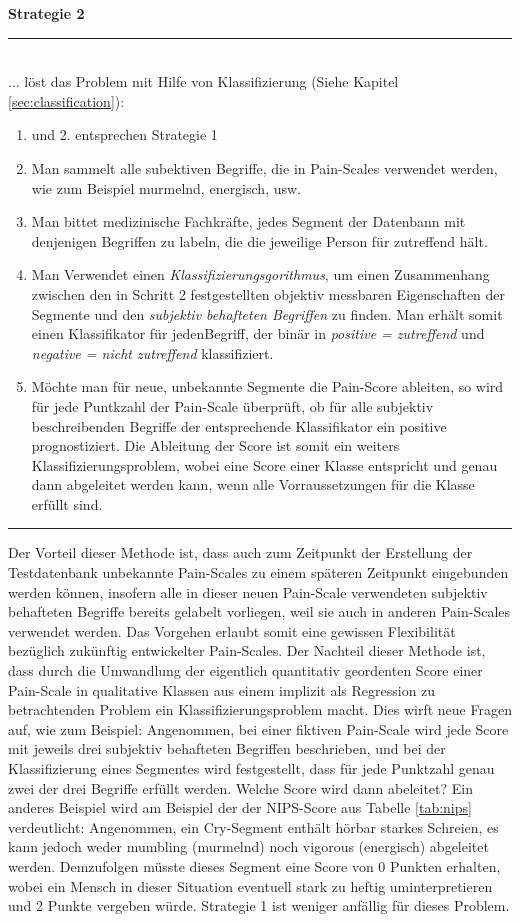 \textbf{Strategie 2} \noindent\rule{0.83\linewidth}{0.3pt} \\
... löst das Problem mit Hilfe von Klassifizierung (Siehe Kapitel \ref{sec:classification}):
\begin{enumerate}
	\item und 2. entsprechen Strategie 1
	\item Man sammelt alle subektiven Begriffe, die in Pain-Scales verwendet werden, wie zum Beispiel \glqq murmelnd\grqq , \glqq energisch\grqq , usw.
	\item Man bittet medizinische Fachkräfte, jedes Segment der Datenbann mit denjenigen Begriffen zu labeln, die die jeweilige Person für zutreffend hält. 
	\item  Man Verwendet einen \emph{Klassifizierungsgorithmus}, um einen Zusammenhang zwischen den in Schritt 2 festgestellten objektiv messbaren Eigenschaften der Segmente und den \emph{subjektiv behafteten Begriffen} zu finden. Man erhält somit einen Klassifikator für jedenBegriff, der binär in \emph{positive = zutreffend} und \emph{negative = nicht zutreffend} klassifiziert.
	\item Möchte man für neue, unbekannte Segmente die Pain-Score ableiten, so wird für jede Puntkzahl der Pain-Scale überprüft, ob für alle subjektiv beschreibenden Begriffe der entsprechende Klassifikator ein positive prognostiziert. Die Ableitung der Score ist somit ein weiters Klassifizierungsproblem, wobei eine Score einer Klasse entspricht und genau dann abgeleitet werden kann, wenn alle Vorraussetzungen für die Klasse erfüllt sind.
\end{enumerate}
\noindent\rule{\linewidth}{0.3pt}

Der Vorteil dieser Methode ist, dass auch zum Zeitpunkt der Erstellung der Testdatenbank unbekannte Pain-Scales zu einem späteren Zeitpunkt eingebunden werden können, insofern alle in dieser neuen Pain-Scale verwendeten subjektiv behafteten Begriffe bereits gelabelt vorliegen, weil sie auch in anderen Pain-Scales verwendet werden. Das Vorgehen erlaubt somit eine gewissen Flexibilität bezüglich zukünftig entwickelter Pain-Scales. Der Nachteil dieser Methode ist, dass durch die Umwandlung der eigentlich quantitativ geordenten Score einer Pain-Scale in qualitative Klassen aus einem implizit als Regression zu betrachtenden Problem ein Klassifizierungsproblem macht. Dies wirft neue Fragen auf, wie zum Beispiel: Angenommen, bei einer fiktiven Pain-Scale wird jede Score mit jeweils drei subjektiv behafteten Begriffen beschrieben, und bei der Klassifizierung eines Segmentes wird festgestellt, dass für jede Punktzahl genau zwei der drei Begriffe erfüllt werden. Welche Score wird dann abeleitet? Ein anderes Beispiel wird am Beispiel der der NIPS-Score aus Tabelle \ref{tab:nips} verdeutlicht: Angenommen, ein Cry-Segment enthält hörbar \glqq starkes\grqq{} Schreien, es kann jedoch weder \glqq mumbling (murmelnd) \grqq{} noch \glqq vigorous (energisch)\grqq{} abgeleitet werden. Demzufolgen müsste dieses Segment eine Score von 0 Punkten erhalten, wobei ein Mensch in dieser Situation eventuell \glqq stark\grqq{} zu \glqq heftig\grqq{} uminterpretieren und 2 Punkte vergeben würde.  Strategie 1 ist weniger anfällig für dieses Problem.

